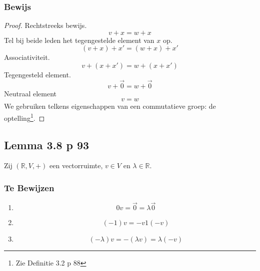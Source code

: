 \documentclass[lineaire_algebra_oplossingen.tex]{subfiles}
\begin{document}
\subsubsection*{Bewijs}
\begin{proof}
Rechtstreeks bewijs.\\
\[
v+x = w+x
\]
Tel bij beide leden het tegengestelde element van $x$ op.
\[
(v+x)+x' = (w+x)+x'
\]
Associativiteit.
\[
v + (x+x') = w+(x+x')
\]
Tegengesteld element.
\[
v + \vec{0} = w + \vec{0}
\]
Neutraal element
\[
v = w
\]
We gebruiken telkens eigenschappen van een commutatieve groep: de optelling\footnote{Zie Definitie 3.2 p 88}.
\end{proof}


\subsection{Lemma 3.8 p 93}
\label{3.8}
Zij $(\mathbb{R},V,+)$ een vectorruimte, $v\in V$ en $\lambda \in \mathbb{R}$.

\subsubsection*{Te Bewijzen}
\begin{enumerate}
\item
\[
0v = \vec{0} = \lambda\vec{0}
\]
\item
\[
(-1)v = -v 1(-v)
\]
\item
\[
(-\lambda)v = -(\lambda v ) = \lambda(-v)
\]
\end{enumerate}
\end{document}
